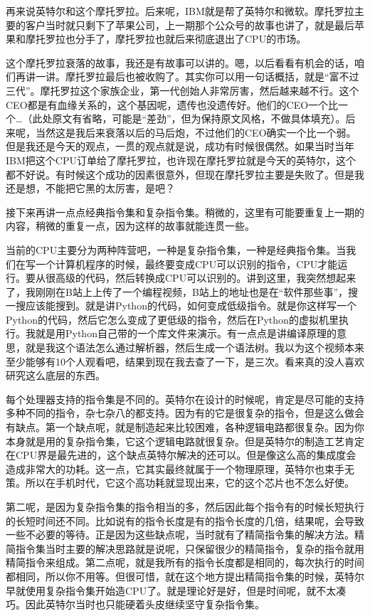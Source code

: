 \documentclass[
  letterpaper,
  DIV=11,
  numbers=noendperiod]{scrreprt}
\begin{document}
再来说英特尔和这个摩托罗拉。后来呢，IBM就是帮了英特尔和微软。摩托罗拉主要的客户当时就只剩下了苹果公司，上一期那个公众号的故事也讲了，就是最后苹果和摩托罗拉也分手了，摩托罗拉也就后来彻底退出了CPU的市场。

这个摩托罗拉衰落的故事，我还是有故事可以讲的。嗯，以后看看有机会的话，咱们再讲一讲。摩托罗拉最后也被收购了。其实你可以用一句话概括，就是``富不过三代''。摩托罗拉这个家族企业，第一代创始人非常厉害，然后越来越不行。这个CEO都是有血缘关系的，这个基因呢，遗传也没遗传好。他们的CEO一个比一个\ldots（此处原文有省略，可能是``差劲''，但为保持原文风格，不做具体填充）。后来呢，当然这是我后来衰落以后的马后炮，不过他们的CEO确实一个比一个弱。但是我还是今天的观点，一贯的观点就是说，成功有时候很偶然。如果当时当年IBM把这个CPU订单给了摩托罗拉，也许现在摩托罗拉就是今天的英特尔，这个都不好说。有时候这个成功的因素很意外，但现在摩托罗拉主要是失败了。但是我还是想，不能把它黑的太厉害，是吧？

接下来再讲一点点经典指令集和复杂指令集。稍微的，这里有可能要重复上一期的内容，稍微的重复一点，因为这样的故事就能连贯一些。

当前的CPU主要分为两种阵营吧，一种是复杂指令集，一种是经典指令集。当我们在写一个计算机程序的时候，最终要变成CPU可以识别的指令，CPU才能运行。要从很高级的代码，然后转换成CPU可以识别的。讲到这里，我突然想起来了，我刚刚在B站上上传了一个编程视频，B站上的地址也是在``软件那些事''，搜一搜应该能搜到。就是讲Python的代码，如何变成低级指令。就是你这样写一个Python的代码，然后它怎么变成了更低级的指令，然后在Python的虚拟机里执行。我就是用Python自己带的一个库文件来演示。有一点点是讲编译原理的意思，就是我这个语法怎么通过解析器，然后生成一个语法树。我以为这个视频本来至少能够有10个人观看吧，结果到现在我去查了一下，是三次。看来真的没人喜欢研究这么底层的东西。

每个处理器支持的指令集是不同的。英特尔在设计的时候呢，肯定是尽可能的支持多种不同的指令，杂七杂八的都支持。因为有的它是很复杂的指令，但是这么做会有缺点。第一个缺点呢，就是制造起来比较困难，各种逻辑电路都很复杂。因为你本身就是用的复杂指令集，它这个逻辑电路就很复杂。但是英特尔的制造工艺肯定在CPU界是最先进的，这个缺点英特尔解决的还可以。但是像这么高的集成度会造成非常大的功耗。这一点，它其实最终就属于一个物理原理，英特尔也束手无策。所以在手机时代，它这个高功耗就显现出来，它的这个芯片也不怎么好使。

第二呢，是因为复杂指令集的指令相当的多，然后因此每个指令有的时候长短执行的长短时间还不同。比如说有的指令长度是有的指令长度的几倍，结果呢，会导致一些不必要的等待。正是因为这些缺点呢，当时就有了精简指令集的解决方法。精简指令集当时主要的解决思路就是说呢，只保留很少的精简指令，复杂的指令就用精简指令来组成。第二点呢，就是我所有的指令长度都是相同的，每次执行的时间都相同，所以你不用等。但很可惜，就在这个地方提出精简指令集的时候，英特尔早就使用复杂指令集开始造CPU了。就是理论好是好，但是时间呢，就不太凑巧。因此英特尔当时也只能硬着头皮继续坚守复杂指令集。
\end{document}
